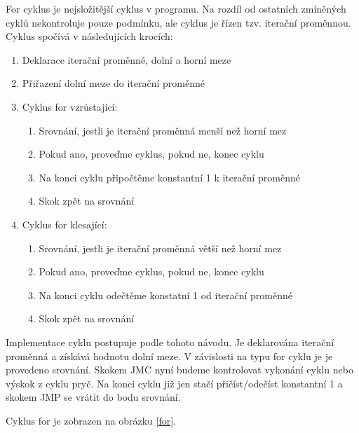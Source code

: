 \documentclass[
12pt,
a4paper,
pdftex,
czech,
titlepage
]{report}
\begin{document}
For cyklus je nejsložitější cyklus v programu. Na rozdíl od ostatních zmíněných cyklů nekontroluje pouze podmínku, ale cyklus je řízen tzv. iterační proměnnou. Cyklus spočívá v následujících krocích:
\begin{enumerate}
\item Deklarace iterační proměnné, dolní a horní meze
\item Přiřazení dolní meze do iterační proměnné
\item Cyklus for vzrůstající:
\begin{enumerate}
\item Srovnání, jestli je iterační proměnná menší než horní mez
\item Pokud ano, proveďme cyklus, pokud ne, konec cyklu
\item Na konci cyklu připočtěme konstantní 1 k iterační proměnné
\item Skok zpět na srovnání
\end{enumerate}
\item Cyklus for klesající:
\begin{enumerate}
\item Srovnání, jestli je iterační proměnná větší než horní mez
\item Pokud ano, proveďme cyklus, pokud ne, konec cyklu
\item Na konci cyklu odečtěme konstatní 1 od iterační proměnné
\item Skok zpět na srovnání
\end{enumerate}
\end{enumerate}

Implementace cyklu postupuje podle tohoto návodu. Je deklarována iterační proměnná a získává hodnotu dolní meze. V závislosti na typu for cyklu je je provedeno srovnání. Skokem JMC nyní budeme kontrolovat vykonání cyklu nebo výskok z cyklu pryč. Na konci cyklu již jen stačí přičíst/odečíst konstantní 1 a skokem JMP se vrátit do bodu srovnání.

Cyklus for je zobrazen na obrázku \ref{for}.
\end{document}
